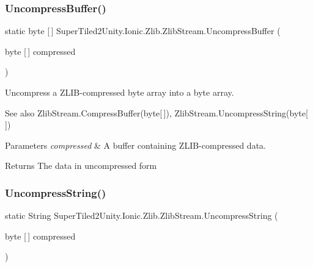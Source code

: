 \subsubsection{\texorpdfstring{Uncompress\+Buffer()}{UncompressBuffer()}}
{\footnotesize\ttfamily static byte \mbox{[}$\,$\mbox{]} Super\+Tiled2\+Unity.\+Ionic.\+Zlib.\+Zlib\+Stream.\+Uncompress\+Buffer (\begin{DoxyParamCaption}\item[{byte \mbox{[}$\,$\mbox{]}}]{compressed }\end{DoxyParamCaption})\hspace{0.3cm}{\ttfamily [static]}}



Uncompress a Z\+L\+I\+B-\/compressed byte array into a byte array. 

\begin{DoxySeeAlso}{See also}
Zlib\+Stream.\+Compress\+Buffer(byte\mbox{[}$\,$\mbox{]}), Zlib\+Stream.\+Uncompress\+String(byte\mbox{[}$\,$\mbox{]})


\end{DoxySeeAlso}



\begin{DoxyParams}{Parameters}
{\em compressed} & A buffer containing Z\+L\+I\+B-\/compressed data. \\
\hline
\end{DoxyParams}


\begin{DoxyReturn}{Returns}
The data in uncompressed form
\end{DoxyReturn}
\mbox{\label{class_super_tiled2_unity_1_1_ionic_1_1_zlib_1_1_zlib_stream_acc82ac42a15bc6f635d772abe3852785}} 
\subsubsection{\texorpdfstring{Uncompress\+String()}{UncompressString()}}
{\footnotesize\ttfamily static String Super\+Tiled2\+Unity.\+Ionic.\+Zlib.\+Zlib\+Stream.\+Uncompress\+String (\begin{DoxyParamCaption}\item[{byte \mbox{[}$\,$\mbox{]}}]{compressed }\end{DoxyParamCaption})\hspace{0.3cm}{\ttfamily [static]}}



